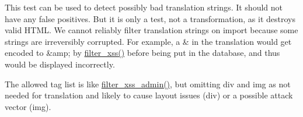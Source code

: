 This test can be used to detect possibly bad translation strings. It should not have any false positives. But it is only a test, not a transformation, as it destroys valid HTML. We cannot reliably filter translation strings on import because some strings are irreversibly corrupted. For example, a \& in the translation would get encoded to \&amp; by \hyperlink{group__sanitization_ga8864a29ffa8de5c9f8dc9e417060660d}{filter\_\-xss()} before being put in the database, and thus would be displayed incorrectly.

The allowed tag list is like \hyperlink{group__sanitization_ga97dcceb77b76539219af2a85eacbe18d}{filter\_\-xss\_\-admin()}, but omitting div and img as not needed for translation and likely to cause layout issues (div) or a possible attack vector (img). 